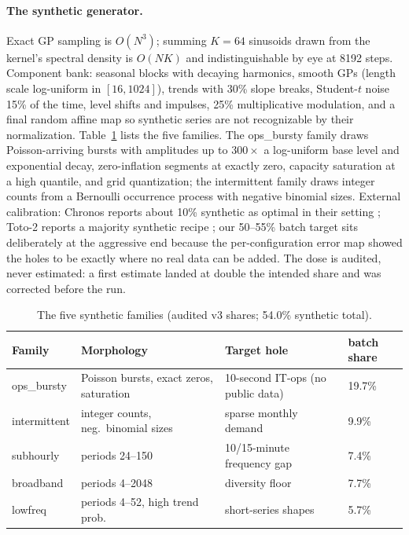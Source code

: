 \paragraph{The synthetic generator.}
Exact GP sampling is $O(N^3)$; summing $K{=}64$ sinusoids drawn from the
kernel's spectral density \citep{rahimi2007rff} is $O(NK)$ and
indistinguishable by eye at 8192 steps. Component bank: seasonal blocks
with decaying harmonics, smooth GPs (length scale log-uniform in
$[16,1024]$), trends with 30\% slope breaks, Student-$t$ noise 15\% of
the time, level shifts and impulses, 25\% multiplicative modulation, and
a final random affine map so synthetic series are not recognizable by
their normalization. Table~\ref{tab:families} lists the five families.
The ops\_bursty family draws Poisson-arriving bursts with amplitudes up
to $300\times$ a log-uniform base level and exponential decay,
zero-inflation segments at exactly zero, capacity saturation at a high
quantile, and grid quantization; the intermittent family draws integer
counts from a Bernoulli occurrence process with negative binomial sizes.
External calibration: Chronos reports about 10\% synthetic as optimal in
their setting \citep{ansari2024chronos}; Toto-2 reports a majority
synthetic recipe \citep{khwaja2026toto2}; our 50--55\% batch target sits
deliberately at the aggressive end because the per-configuration error
map showed the holes to be exactly where no real data can be added. The
dose is audited, never estimated: a first estimate landed at double the
intended share and was corrected before the run.

\begin{table}[t]
\centering
\small
\begin{tabular}{llll}
\toprule
Family & Morphology & Target hole & batch share \\
\midrule
ops\_bursty & Poisson bursts, exact zeros, saturation & 10-second IT-ops (no public data) & 19.7\% \\
intermittent & integer counts, neg.\ binomial sizes & sparse monthly demand & 9.9\% \\
subhourly & periods 24--150 & 10/15-minute frequency gap & 7.4\% \\
broadband & periods 4--2048 & diversity floor & 7.7\% \\
lowfreq & periods 4--52, high trend prob. & short-series shapes & 5.7\% \\
\bottomrule
\end{tabular}
\caption{The five synthetic families (audited v3 shares; 54.0\% synthetic
total).}
\label{tab:families}
\end{table}

